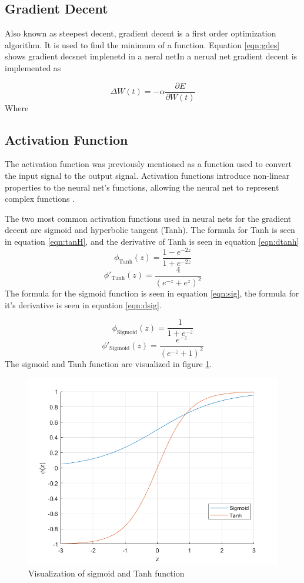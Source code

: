 \documentclass[12pt]{article}
\begin{document}
	\subsection{Gradient Decent}
	Also known as steepest decent, gradient decent is a first order optimization algorithm. It is used to find the minimum of a function. Equation \ref{eqn:gdes} shows gradient decsnet implenetd in a neral netIn a nerual net  gradient decent is implemented as  
	
	\begin{equation}
	\Delta W(t) = - \alpha \frac{\partial E}{\partial W(t)}
	\label{eqn:gdes}
	\end{equation}
	Where 
	
	\subsection{Activation Function}
	The activation function was previously mentioned as a function used to convert the input signal to the output signal. Activation functions introduce non-linear properties to the neural net's functions, allowing the neural net to represent complex functions \cite{nnBlog}. \par 
	The two most common activation functions used in neural nets for the gradient decent are sigmoid and hyperbolic tangent (Tanh). 
	The formula for Tanh is seen in equation \ref{eqn:tanH}, and the derivative of Tanh is seen in equation \ref{eqn:dtanh} 
	\begin{equation}
	\phi_{\text{Tanh}}(z)=\frac{1-e^{-2z}}{1+e^{-2z}}
	\label{eqn:tanH}
	\end{equation}
	\begin{equation}
	\phi'_{\text{Tanh}}(z)=\frac{4}{\left(e^{-z}+e^{z}\right)^2}
	\label{eqn:dtanh}
	\end{equation}
	The formula for the sigmoid function is seen in equation \ref{eqn:sig}, the formula for it's derivative is seen in equation \ref{eqn:dsig}.
	
	\begin{equation}
	\phi_{\text{Sigmoid}}(z)=\frac{1}{1+e^{-z}}
	\label{eqn:sig}
	\end{equation}
	\begin{equation}
	\phi'_{\text{Sigmoid}}(z)=\frac{e^{-z}}{\left(e^{-z}+1\right)^2}
	\label{eqn:dsig}
	\end{equation}
	The sigmoid and Tanh function are visualized in figure \ref{fig:sigvstanh}.
	
	\begin{figure}
		\centering
		\includegraphics[width=0.4\linewidth]{sigVsTanh}
		\caption{Visualization of sigmoid and Tanh function}
		\label{fig:sigvstanh}
	\end{figure}
\end{document}
